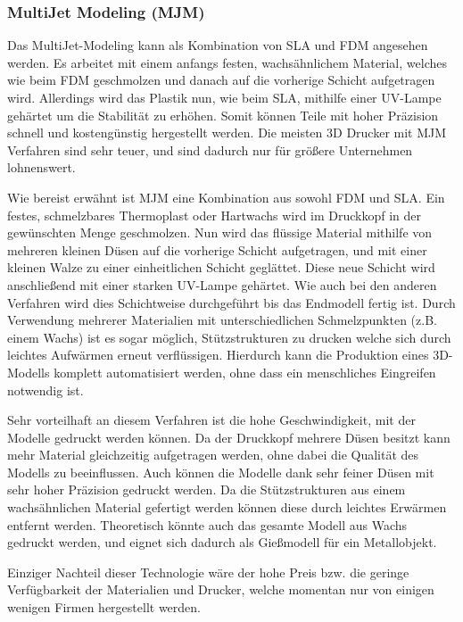 \subsubsection{MultiJet Modeling (MJM)}

Das MultiJet-Modeling kann als Kombination von SLA und FDM angesehen werden. Es arbeitet mit einem anfangs festen, wachsähnlichem Material, welches wie beim FDM geschmolzen und danach auf die vorherige Schicht aufgetragen wird. Allerdings wird das Plastik nun, wie beim SLA, mithilfe einer UV-Lampe gehärtet um die Stabilität zu erhöhen. Somit können Teile mit hoher Präzision schnell und kostengünstig hergestellt werden. Die meisten 3D Drucker mit MJM Verfahren sind sehr teuer, und sind dadurch nur für größere Unternehmen lohnenswert.

Wie bereist erwähnt ist MJM eine Kombination aus sowohl FDM und SLA. Ein festes, schmelzbares Thermoplast oder Hartwachs wird im Druckkopf in der gewünschten Menge geschmolzen. Nun wird das flüssige Material mithilfe von mehreren kleinen Düsen auf die vorherige Schicht aufgetragen, und mit einer kleinen Walze zu einer einheitlichen Schicht geglättet. Diese neue Schicht wird anschließend mit einer starken UV-Lampe gehärtet. Wie auch bei den anderen Verfahren wird dies Schichtweise durchgeführt bis das Endmodell fertig ist. Durch Verwendung mehrerer Materialien mit unterschiedlichen Schmelzpunkten (z.B. einem Wachs) ist es sogar möglich, Stützstrukturen zu drucken welche sich durch leichtes Aufwärmen erneut verflüssigen. Hierdurch kann die Produktion eines 3D-Modells komplett automatisiert werden, ohne dass ein menschliches Eingreifen notwendig ist.

Sehr vorteilhaft an diesem Verfahren ist die hohe Geschwindigkeit, mit der Modelle gedruckt werden können. Da der Druckkopf mehrere Düsen besitzt kann mehr Material gleichzeitig aufgetragen werden, ohne dabei die Qualität des Modells zu beeinflussen. Auch können die Modelle dank sehr feiner Düsen mit sehr hoher Präzision gedruckt werden. Da die Stützstrukturen aus einem wachsähnlichen Material gefertigt werden können diese durch leichtes Erwärmen entfernt werden. Theoretisch könnte auch das gesamte Modell aus Wachs gedruckt werden, und eignet sich dadurch als Gießmodell für ein Metallobjekt.

Einziger Nachteil dieser Technologie wäre der hohe Preis bzw. die geringe Verfügbarkeit der Materialien und Drucker, welche momentan nur von einigen wenigen Firmen hergestellt werden. \parencite[Informationen aus:][]{DRUCKVERFAHREN,WIKIMJM}